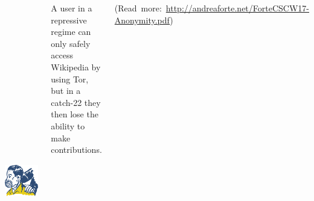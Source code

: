 \documentclass[25pt, a0paper, landscape, cmyk]{tikzposter}
\begin{document}
\begin{columns}
{    \begin{tikzfigure}
      \includegraphics[height=15.65cm]{censored-nospeaking.eps}
    \end{tikzfigure}

    A user in a repressive regime can only safely access Wikipedia by
    using Tor, but in a catch-22 they then lose the ability to make
    contributions.

    \hfill(Read~more:~\url{http://andreaforte.net/ForteCSCW17-Anonymity.pdf})
  }
\end{columns}
\end{document}
